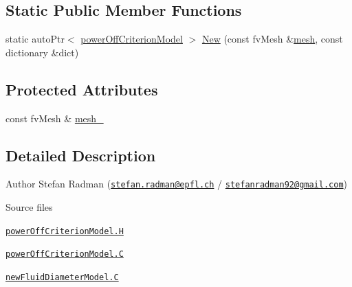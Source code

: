 \subsection*{Static Public Member Functions}
\begin{DoxyCompactItemize}
\item 
static auto\+Ptr$<$ \hyperlink{classFoam_1_1powerOffCriterionModel}{power\+Off\+Criterion\+Model} $>$ \hyperlink{classFoam_1_1powerOffCriterionModel_a445418bc93382ac90be716e05c34c7b5}{New} (const fv\+Mesh \&\hyperlink{createMeshesPostProcess_8H_a8bb1e58291d2d2b653e024a4f4bffe38}{mesh}, const dictionary \&dict)
\end{DoxyCompactItemize}
\subsection*{Protected Attributes}
\begin{DoxyCompactItemize}
\item 
const fv\+Mesh \& \hyperlink{classFoam_1_1powerOffCriterionModel_a23edeeeecebcef11921a33dd5d990570}{mesh\+\_\+}
\end{DoxyCompactItemize}


\subsection{Detailed Description}
Author Stefan Radman (\href{mailto:stefan.radman@epfl.ch}{\tt stefan.\+radman@epfl.\+ch} / \href{mailto:stefanradman92@gmail.com}{\tt stefanradman92@gmail.\+com}) 

\label{_Description}%
 \begin{DoxyParagraph}{Source files}

\begin{DoxyItemize}
\item \href{../../../home/carlo/data/GeN-Foam/GeN-Foam_ffn/GeN-Foam/GeN-Foam/classes/thermalHydraulics/src/phaseModels/structureModels/powerOffCriterionModels/powerOffCriterionModel.H}{\tt power\+Off\+Criterion\+Model.\+H} 
\item \href{../../../home/carlo/data/GeN-Foam/GeN-Foam_ffn/GeN-Foam/GeN-Foam/classes/thermalHydraulics/src/phaseModels/structureModels/powerOffCriterionModels/powerOffCriterionModel.C}{\tt power\+Off\+Criterion\+Model.\+C} 
\item \href{../../../home/carlo/data/GeN-Foam/GeN-Foam_ffn/GeN-Foam/GeN-Foam/classes/thermalHydraulics/src/phaseModels/structureModels/powerOffCriterionModels/newFluidDiameterModel.C}{\tt new\+Fluid\+Diameter\+Model.\+C} 
\end{DoxyItemize}
\end{DoxyParagraph}


